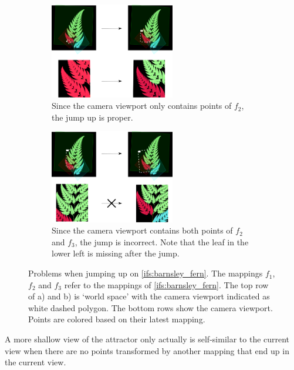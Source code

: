 \documentclass[11pt]{article}
\begin{document}
\begin{enumerate}
\begin{figure}
     \centering
     \begin{subfigure}[b]{\textwidth}
         \centering
         \includegraphics[width=0.6\textwidth]{figures/barnsley_colored_jump1}
         \caption{Since the camera viewport only contains points of $f_2$, the jump up is proper.}
         \label{figure:barnsley_jump_a}
     \end{subfigure}
     \hfill
     \begin{subfigure}[b]{\textwidth}
         \centering
         \includegraphics[width=0.6\textwidth]{figures/barnsley_colored_jump2}
         \caption{Since the camera viewport contains both points of $f_2$ and $f_3$, the jump is incorrect. 
Note that the leaf in the lower left is missing after the jump.}
         \label{figure:barnsley_jump_b}
     \end{subfigure}
        \caption{Problems when jumping up on \autoref{ifs:barnsley_fern}. 
The mappings $f_1$, $f_2$ and $f_3$ refer to the mappings of \autoref{ifs:barnsley_fern}. 
The top row of a) and b) is `world space' with the camera viewport indicated as white dashed polygon. 
The bottom rows show the camera viewport.
Points are colored based on their latest mapping. }
        \label{figure:barnsley_jump}
\end{figure}

A more shallow view of the attractor only actually is self-similar to the current view when
there are no points transformed by another mapping that end up in the current view.


\end{enumerate}
\end{document}
